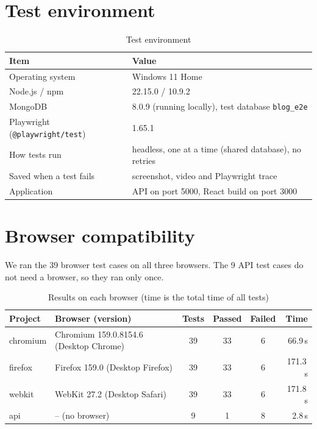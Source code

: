 \documentclass[12pt,a4paper,oneside]{report}
\newcommand{\code}[1]{\texttt{#1}}
\begin{document}
\section{Test environment}

\begin{table}[H]
\centering
\small
\begin{tabular}{ll}
\toprule
\textbf{Item} & \textbf{Value} \\
\midrule
Operating system & Windows 11 Home \\
Node.js / npm & 22.15.0 / 10.9.2 \\
MongoDB & 8.0.9 (running locally), test database \code{blog\_e2e} \\
Playwright (\code{@playwright/test}) & 1.65.1 \\
How tests run & headless, one at a time (shared database), no retries \\
Saved when a test fails & screenshot, video and Playwright trace \\
Application & API on port 5000, React build on port 3000 \\
\bottomrule
\end{tabular}
\caption{Test environment}
\end{table}

\section{Browser compatibility}

We ran the 39 browser test cases on all three browsers. The 9 API test cases do
not need a browser, so they ran only once.

\begin{table}[H]
\centering
\small
\begin{tabular}{llcccr}
\toprule
\textbf{Project} & \textbf{Browser (version)} & \textbf{Tests} & \textbf{Passed} & \textbf{Failed} & \textbf{Time} \\
\midrule
chromium & Chromium 159.0.8154.6 (Desktop Chrome) & 39 & 33 & 6 & 66.9\,s \\
firefox  & Firefox 159.0 (Desktop Firefox) & 39 & 33 & 6 & 171.3\,s \\
webkit   & WebKit 27.2 (Desktop Safari) & 39 & 33 & 6 & 171.8\,s \\
api      & -- (no browser) & 9 & 1 & 8 & 2.8\,s \\
\bottomrule
\end{tabular}
\caption{Results on each browser (time is the total time of all tests)}
\label{tab:browsers}
\end{table}
\end{document}
